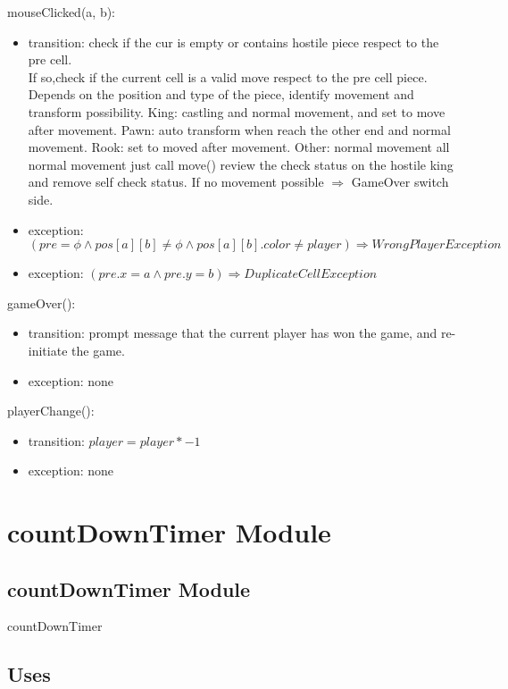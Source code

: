 \documentclass[12pt]{article}
\begin{document}
{\noindent mouseClicked(a, b):
\begin{itemize}
\item transition:  check if the cur is empty or contains hostile piece respect to the pre cell.\\ 
If so,check if the current cell is a valid move respect to the pre cell piece.\\
Depends on the position and type of the piece, identify movement and transform possibility.
\subitem King: castling and normal movement, and set to move after movement.
\subitem Pawn: auto transform when reach the other end and normal movement.
\subitem Rook: set to moved after movement.
\subitem Other: normal movement 
\subitem all normal movement just call move()
review the check status on the hostile king and remove self check status.
If no movement possible $\Rightarrow$ GameOver
switch side.
\item exception: $(pre = \phi \wedge pos[a][b] \ne \phi \wedge pos[a][b].color \ne player) \Rightarrow WrongPlayerException $
\item exception: $(pre.x = a \wedge pre.y = b) \Rightarrow DuplicateCellException$
\end{itemize}
\color{red}
\noindent gameOver():
\begin{itemize}
\item transition: prompt message that the current player has won the game, and re-initiate the game.
\item exception: none
\end{itemize}

\noindent playerChange():
\begin{itemize}
\item transition: $player = player * -1$
\item exception: none
\end{itemize}
\newpage
\section* {countDownTimer Module}

\subsection* {countDownTimer Module}

countDownTimer

\subsection* {Uses}

}
\end{document}

